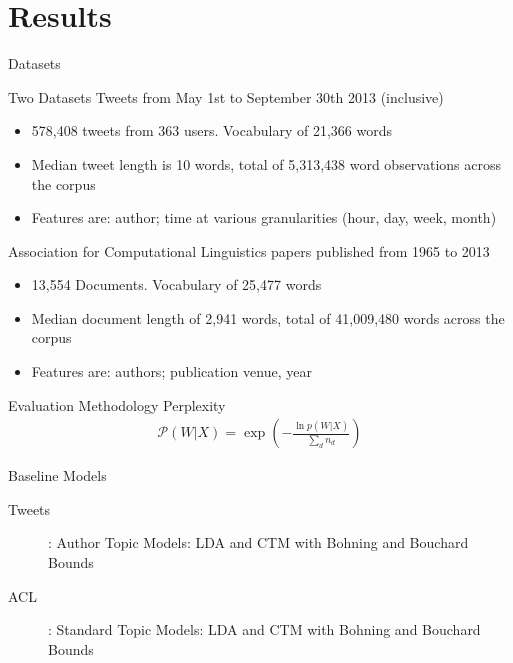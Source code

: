 \documentclass[xcolor=dvipsnames]{beamer}
\begin{document}

\section{Results}
\begin{frame}{Datasets}

Two Datasets
Tweets from May 1st to September 30th 2013 (inclusive)
\begin{itemize}
    \item 578,408 tweets from 363 users. Vocabulary of 21,366 words
    \item Median tweet length is 10 words, total of 5,313,438 word observations across the corpus 
    \item Features are: author; time at various granularities (hour, day, week, month)
\end{itemize}

Association for Computational Linguistics papers published from 1965 to 2013
\begin{itemize}
    \item 13,554 Documents. Vocabulary of 25,477 words
    \item Median document length of 2,941 words, total of 41,009,480 words across the corpus
    \item Features are: authors; publication venue, year
\end{itemize}

\end{frame}

\begin{frame}{Evaluation Methodology}
 {
    Perplexity
    \begin{align*}
    \mathcal{P}(W|X) = \exp \left( - \frac{\ln p(W|X)}{\sum_d n_d}   \right)
    \end{align*}
}
 {
Baseline Models
\begin{description}
\item[Tweets]: Author Topic Models: LDA and CTM with Bohning and Bouchard Bounds
\item[ACL]: Standard Topic Models: LDA and CTM with Bohning and Bouchard Bounds
\end{description}

}

\end{frame}
\end{document}
